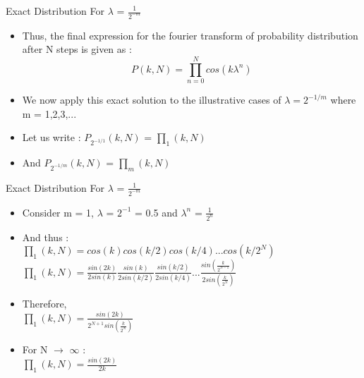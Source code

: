 \documentclass{beamer}
\begin{document}
\begin{frame}{Exact Distribution For $\lambda$ = $\frac{1}{2^{-m}}$}
	\begin{itemize}
	\setlength\itemsep{1em}
		\item{\large Thus, the final expression for the fourier transform of probability distribution after N steps is given as :}
		\begin{equation}
			P(k,N) = \prod_{n=0}^{N} cos(k\lambda^{n})
		\end{equation}
		\item{\large We now apply this exact solution to the illustrative cases of $\lambda=2^{-1/m}$ where m = 1,2,3,...}
		\item{\large Let us write : $P_{2^{-1/1}}(k,N)$ = $\prod_{1}(k,N)$}
		\item{\large And $P_{2^{-1/m}}(k,N)$ = $\prod_{m}(k,N)$}
	\end{itemize}
\end{frame}

\begin{frame}{Exact Distribution For $\lambda$ = $\frac{1}{2^{-m}}$}
	\begin{itemize}
	\setlength\itemsep{1em}
		\item{\large Consider m = 1, $\lambda$ = $2^{-1}$ = 0.5 and $\lambda^{n}$ = $\frac{1}{2^{n}}$}
		\item{\large And thus :\\
		\vspace{1em} \hspace{1em}
		$\prod_{1}(k,N) = cos(k) cos(k/2) cos(k/4) ... cos(k/2^{N})$\\
		\vspace{1em} \hspace{2em}
		$\prod_{1}(k,N) = \frac{sin(2k)}{2sin(k)} \frac{sin(k)}{2sin(k/2)} \frac{sin(k/2)}{2sin(k/4)} ... \frac{sin(\frac{k}{2^{N-1}})}{2sin(\frac{k}{2^{N}})}$}
		\item{Therefore,\\
		\vspace{1em} \hspace{8em} \large $\prod_{1}(k,N) = \frac{sin(2k)}{2^{N+1}sin(\frac{k}{2^{N}})}$}
		\item{\large For N $\rightarrow$ $\infty$ :\\
		\vspace{1em} \hspace{7.6em}
		$\prod_{1}(k,N)=\frac{sin(2k)}{2k}$}
	\end{itemize}
\end{frame}
\end{document}
